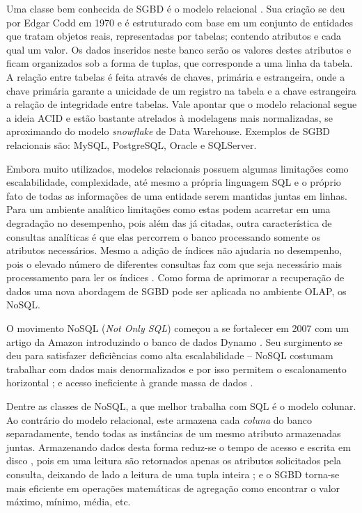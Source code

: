 \documentclass[conference]{IEEEtran}
\begin{document}
Uma classe bem conhecida de SGBD é o modelo relacional \cite{brito2010bancos}. Sua criação se deu por Edgar Codd em 1970 \cite{codd1970relational} e é estruturado com base em um conjunto de entidades que tratam objetos reais, representadas por tabelas; contendo atributos e cada qual um valor. Os dados inseridos neste banco serão os valores destes atributos e ficam organizados sob a forma de tuplas, que corresponde a uma linha da tabela. A relação entre tabelas é feita através de chaves, primária e estrangeira, onde a chave primária garante a unicidade de um registro na tabela e a chave estrangeira a relação de integridade entre tabelas. Vale apontar que o modelo relacional segue a ideia ACID e estão bastante atrelados à modelagens mais normalizadas, se aproximando do modelo \textit{snowflake} de Data Warehouse. Exemplos de SGBD relacionais são: MySQL, PostgreSQL, Oracle e SQLServer.

Embora muito utilizados, modelos relacionais possuem algumas limitações como escalabilidade, complexidade, até mesmo a própria linguagem SQL \cite{leavitt2010will} e o próprio fato de todas as informações de uma entidade serem mantidas juntas em linhas. Para um ambiente analítico limitações como estas podem acarretar em uma degradação no desempenho, pois além das já citadas, outra característica de consultas analíticas é que elas percorrem o banco processando somente os atributos necessários. Mesmo a adição de índices não ajudaria no desempenho, pois o elevado número de diferentes consultas faz com que seja necessário mais processamento para ler os índices \cite{matei2010column}. Como forma de aprimorar a recuperação de dados uma nova abordagem de SGBD pode ser aplicada no ambiente OLAP, os NoSQL. 

O movimento NoSQL (\textit{Not Only SQL}) começou a se fortalecer em 2007 com um artigo da Amazon introduzindo o banco de dados Dynamo  \cite{decandia2007dynamo, leavitt2010will}. Seu surgimento se deu para satisfazer deficiências como alta escalabilidade -- NoSQL costumam trabalhar com dados mais denormalizados e por isso permitem o escalonamento horizontal \cite{cattell2011scalable}; e acesso ineficiente à grande massa de dados \cite{han2011nosql}. 

Dentre as classes de NoSQL, a que melhor trabalha com SQL é o modelo colunar. Ao contrário do modelo relacional, este armazena cada \textit{coluna} do banco separadamente, tendo todas as instâncias de um mesmo atributo armazenadas juntas. Armazenando dados desta forma reduz-se o tempo de acesso e escrita em disco \cite{matei2010column, abadi2008query}, pois em uma leitura são retornados apenas os atributos solicitados pela consulta, deixando de lado a leitura de uma tupla inteira \cite{khoshafian1987query}; e o SGBD torna-se mais eficiente em operações matemáticas de agregação \cite{matei2010column} como encontrar o valor máximo, mínimo, média, etc.
\end{document}
